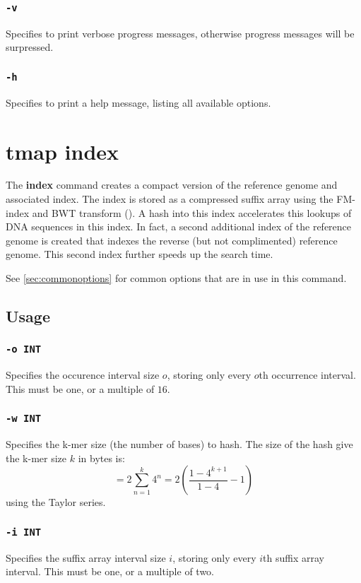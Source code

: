 \documentclass[a4paper,12pt]{book}
\newcommand{\TT}[1]{{\tt #1}} %
\newcommand{\BF}[1]{{\bf #1}} %
\begin{document}
\subsubsection{\TT{-v}}
Specifies to print verbose progress messages, otherwise progress messages will be surpressed.

\subsubsection{\TT{-h}}
Specifies to print a help message, listing all available options.

\section{tmap index}
\label{sec:index}
The \BF{index} command creates a compact version of the reference genome and associated index.
The index is stored as a compressed suffix array using the FM-index and BWT transform (\cite{FM-index,BWT}).
A hash into this index accelerates this lookups of DNA sequences in this index.
In fact, a second additional index of the reference genome is created that indexes the reverse (but not complimented) reference genome.
This second index further speeds up the search time.

See \autoref{sec:commonoptions} for common options that are in use in this command.

\subsection{Usage}

\subsubsection{\TT{-o INT}}
Specifies the occurence interval size $o$, storing only every $o$th occurrence interval.
This must be one, or a multiple of $16$.

\subsubsection{\TT{-w INT}}
Specifies the k-mer size (the number of bases) to hash.
The size of the hash give the k-mer size $k$ in bytes is:
\[
= 2 \sum_{n=1}^{k} 4^{n}
= 2 \left(\frac{1 - 4^{k+1}}{1-4} - 1\right)
\]
using the Taylor series.

\subsubsection{\TT{-i INT}}
Specifies the suffix array interval size $i$, storing only every $i$th suffix array interval.
This must be one, or a multiple of two.
\end{document}
